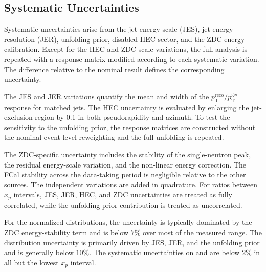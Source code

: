 \subsection{Systematic Uncertainties}

Systematic uncertainties arise from the jet energy scale (JES), jet energy
resolution (JER), unfolding prior, disabled HEC sector, and the ZDC energy
calibration. Except for the HEC and ZDC-scale variations, the full analysis is
repeated with a response matrix modified according to each systematic
variation. The difference relative to the nominal result defines the
corresponding uncertainty.

The JES and JER variations quantify the mean and width of the
$p_{\mathrm{T}}^{\mathrm{reco}}/p_{\mathrm{T}}^{\mathrm{gen}}$ response for
matched jets. The HEC uncertainty is evaluated by enlarging the jet-exclusion
region by 0.1 in both pseudorapidity and azimuth. To test the sensitivity to
the unfolding prior, the response matrices are constructed without the nominal
event-level reweighting and the full unfolding is repeated.

The ZDC-specific uncertainty includes the stability of the single-neutron peak,
the residual energy-scale variation, and the non-linear energy correction. The
FCal stability across the data-taking period is negligible relative to the
other sources. The independent variations are added in quadrature. For ratios
between $x_p$ intervals, JES, JER, HEC, and ZDC uncertainties are treated as
fully correlated, while the unfolding-prior contribution is treated as
uncorrelated.

For the normalized distributions, the \EZDC uncertainty is typically dominated
by the ZDC energy-stability term and is below $7\%$ over most of the measured
range. The \ETPB distribution uncertainty is primarily driven by JES, JER, and
the unfolding prior and is generally below $10\%$. The systematic uncertainties
on \AZDC and \EATPB are below $2\%$ in all but the lowest $x_p$ interval.
